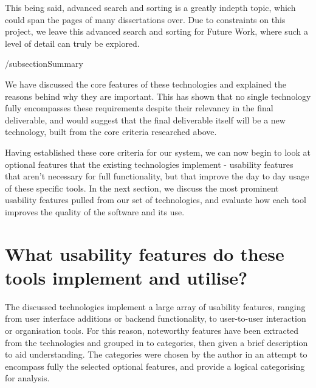 This being said, advanced search and sorting is a greatly indepth topic, which could span the pages of many dissertations over. 
Due to constraints on this project, we leave this advanced search and sorting for Future Work, where such a level of detail can truly be explored.

/subsection{Summary}

We have discussed the core features of these technologies and explained the reasons behind why they are important.
This has shown that no single technology fully encompasses these requirements despite their relevancy in the final deliverable, and would suggest that the final deliverable itself will be a new technology, built from the core criteria researched above.

Having established these core criteria for our system, we can now begin to look at optional features that the existing technologies implement - usability features that aren't necessary for full functionality, but that improve the day to day usage of these specific tools.
In the next section, we discuss the most prominent usability features pulled from our set of technologies, and evaluate how each tool improves the quality of the software and its use.

\section{What usability features do these tools implement and utilise?} \label{optionalfeatures}
The discussed technologies implement a large array of usability features, ranging from user interface additions or backend functionality, to user-to-user interaction or organisation tools.
For this reason, noteworthy features have been extracted from the technologies and grouped in to categories, then given a brief description to aid understanding.
The categories were chosen by the author in an attempt to encompass fully the selected optional features, and provide a logical categorising for analysis.

